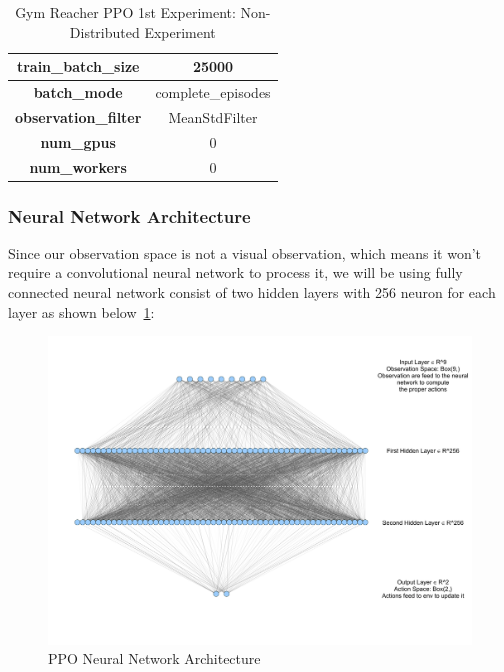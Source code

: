 \begin{table}[!htb]
\begin{tabular}{|c|l|l|c|l|l|}
				\multicolumn{3}{|c|}{\textbf{train\_batch\_size}}                   & \multicolumn{3}{c|}{25000}                                                          \\ \hline
				\multicolumn{3}{|c|}{\textbf{batch\_mode}}                          & \multicolumn{3}{c|}{complete\_episodes}                                             \\ \hline
				\multicolumn{3}{|c|}{\textbf{observation\_filter}}                  & \multicolumn{3}{c|}{MeanStdFilter}                                                  \\ \hline
				\multicolumn{3}{|c|}{\cellcolor[HTML]{C0C0C0}\textbf{num\_gpus}}    & \multicolumn{3}{c|}{\cellcolor[HTML]{C0C0C0}0}                                      \\ \hline
				\multicolumn{3}{|c|}{\cellcolor[HTML]{C0C0C0}\textbf{num\_workers}} & \multicolumn{3}{c|}{\cellcolor[HTML]{C0C0C0}0}                                      \\ \hline
		\end{tabular}
		\caption{Gym Reacher PPO 1st Experiment: Non-Distributed Experiment}
		\label{tab:gym_reacher_ppo_1st_exp}
\end{table}


\subsubsection{Neural Network Architecture}
Since our observation space is not a visual observation, which means it won't require a convolutional neural network to process it, we will be using fully connected neural network consist of two hidden layers with 256 neuron for each layer as shown below~\ref{fig:ppo_nn}:

\begin{figure}[!htb]
		\centering
				\includegraphics[width=\linewidth]{figures/exps/1st_exp/ppo_nn}
				\caption{PPO Neural Network Architecture}
				\label{fig:ppo_nn}
\end{figure}


